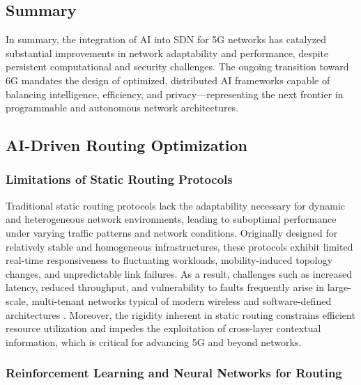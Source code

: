 \subsection{Summary}

In summary, the integration of AI into SDN for 5G networks has catalyzed substantial improvements in network adaptability and performance, despite persistent computational and security challenges. The ongoing transition toward 6G mandates the design of optimized, distributed AI frameworks capable of balancing intelligence, efficiency, and privacy—representing the next frontier in programmable and autonomous network architectures.

\subsection{AI-Driven Routing Optimization}

\subsubsection{Limitations of Static Routing Protocols}

Traditional static routing protocols lack the adaptability necessary for dynamic and heterogeneous network environments, leading to suboptimal performance under varying traffic patterns and network conditions. Originally designed for relatively stable and homogeneous infrastructures, these protocols exhibit limited real-time responsiveness to fluctuating workloads, mobility-induced topology changes, and unpredictable link failures. As a result, challenges such as increased latency, reduced throughput, and vulnerability to faults frequently arise in large-scale, multi-tenant networks typical of modern wireless and software-defined architectures \cite{ref53}. Moreover, the rigidity inherent in static routing constrains efficient resource utilization and impedes the exploitation of cross-layer contextual information, which is critical for advancing 5G and beyond networks.

\subsubsection{Reinforcement Learning and Neural Networks for Routing}


